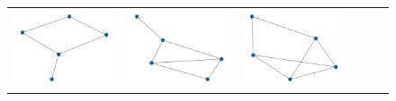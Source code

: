 \documentclass[11pt,a4paper,openright,oneside]{book}
\numberwithin{equation}{section}
\begin{document}
{\begin{figure}[h]
\begin{adjustwidth}{-3cm}{-3cm}
\begin{tabular}{>{\centering\arraybackslash}m{1.5cm} m{2.5cm} m{2.5cm} m{2.5cm} m{2.5cm} m{2.5cm}}
        \rule{0pt}{0.01cm} \includegraphics[width=\linewidth]{media/tnale/graph-1-tnale-1.png} \rule{0pt}{0.01cm}&
        \rule{0pt}{0.01cm} \includegraphics[width=\linewidth]{media/tnale/graph-2-tnale-1.png} \rule{0pt}{0.01cm}&
        \rule{0pt}{0.01cm} \includegraphics[width=\linewidth]{media/tnale/graph-3-tnale-1.png} \rule{0pt}{0.01cm}& 

\end{tabular}
\end{adjustwidth}
\end{figure}}
\end{document}
